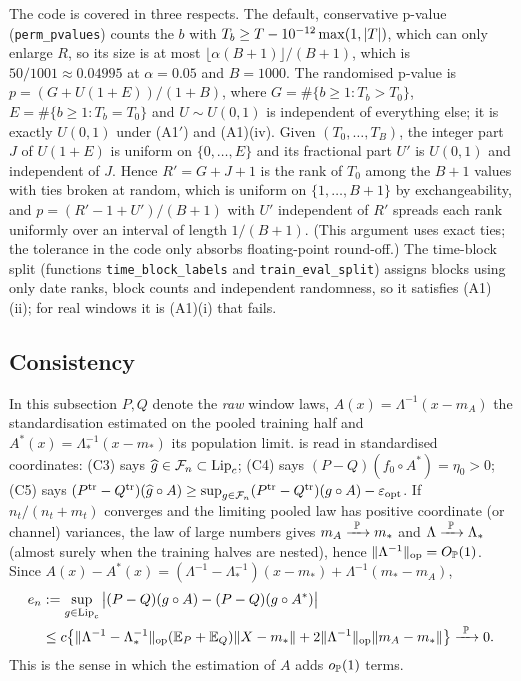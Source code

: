 The code is covered in three respects. The default, conservative p-value (\texttt{perm\_pvalues})
counts the $b$ with $T_b\ge T-10^{-12}\max(1,\lvert T\rvert)$, which can only enlarge $R$, so its size is
at most $\lfloor\alpha(B+1)\rfloor/(B+1)$, which is $50/1001\approx0.04995$ at $\alpha=0.05$ and
$B=1000$. The randomised p-value is $p=(G+U(1+E))/(1+B)$, where $G=\#\{b\ge1:T_b>T_0\}$,
$E=\#\{b\ge1:T_b=T_0\}$ and $U\sim U(0,1)$ is independent of everything else; it is exactly
$U(0,1)$ under (A1$'$) and (A1)(iv). Given $(T_0,\dots,T_B)$, the integer part $J$ of $U(1+E)$ is
uniform on $\{0,\dots,E\}$ and its fractional part $U'$ is $U(0,1)$ and independent of $J$. Hence
$R'=G+J+1$ is the rank of $T_0$ among the $B+1$ values with ties broken at random, which is
uniform on $\{1,\dots,B+1\}$ by exchangeability, and $p=(R'-1+U')/(B+1)$ with $U'$ independent of
$R'$ spreads each rank uniformly over an interval of length $1/(B+1)$. (This argument uses exact
ties; the tolerance in the code only absorbs floating-point round-off.) The time-block split (functions
\texttt{time\_block\_labels} and \texttt{train\_eval\_split}) assigns blocks using only date
ranks, block counts and independent randomness, so it satisfies (A1)(ii); for real windows it is
(A1)(i) that fails.

\subsection{Consistency}\label{app:proofs-consistency}

In this subsection $P,Q$ denote the \emph{raw} window laws, $A(x)=\Lambda^{-1}(x-m_A)$ the
standardisation estimated on the pooled training half and $A^*(x)=\Lambda_*^{-1}(x-m_*)$ its
population limit.  is read in standardised coordinates: (C3) says
$\widehat{g}\in\mathcal F_n\subset\operatorname{Lip}_c$; (C4) says $(P-Q)(f_0\circ A^*)=\eta_0>0$; (C5) says
$(P^{\mathrm{tr}}-Q^{\mathrm{tr}})(\widehat{g}\circ A)\ge\sup_{g\in\mathcal F_n}(P^{\mathrm{tr}}-Q^{\mathrm{tr}})(g\circ A)-\varepsilon_{\mathrm{opt}}$.
If $n_t/(n_t+m_t)$ converges and the limiting pooled law has positive coordinate (or channel)
variances, the law of large numbers gives $m_A\xrightarrow{\ \mathbb{P}\ } m_*$ and $\Lambda\xrightarrow{\ \mathbb{P}\ }\Lambda_*$ (almost surely
when the training halves are nested), hence $\lVert\Lambda^{-1}\rVert_{\mathrm{op}}=O_{\mathbb{P}}(1)$.
Since $A(x)-A^*(x)=(\Lambda^{-1}-\Lambda_*^{-1})(x-m_*)+\Lambda^{-1}(m_*-m_A)$,
\begin{equation}\label{eq:app-std-error}
\begin{split}
  e_n&:=\sup_{g\in\operatorname{Lip}_c}\big|(P-Q)(g\circ A)-(P-Q)(g\circ A^*)\big|\\
  &\le c\big\{\lVert\Lambda^{-1}-\Lambda_*^{-1}\rVert_{\mathrm{op}}(\mathbb{E}_P+\mathbb{E}_Q)\lVert X-m_*\rVert
  +2\lVert\Lambda^{-1}\rVert_{\mathrm{op}}\lVert m_A-m_*\rVert\big\}\xrightarrow{\ \mathbb{P}\ }0 .
\end{split}
\end{equation}
This is the sense in which the estimation of $A$ adds $o_{\mathbb{P}}(1)$ terms.

